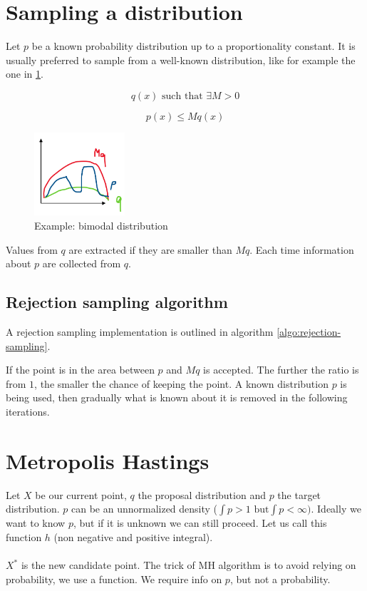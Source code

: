 \section{Sampling a distribution}
Let $p$ be a known probability distribution up to a proportionality constant.
It is usually preferred to sample from a well-known distribution, like for example the one in \ref{fig:bimodal}.

$$q(x)\text{ such that }\exists M>0$$

$$p(x) \leq M q(x)$$


\begin{figure}
  \centering
  \includegraphics[width=0.3\textwidth]{distribution.png}
  \caption{Example: bimodal distribution}
  \label{fig:bimodal}
\end{figure}

Values from $q$ are extracted if they are smaller than $Mq$.
Each time information about $p$ are collected from $q$.

  \subsection{Rejection sampling algorithm}
  A rejection sampling implementation is outlined in algorithm \ref{algo:rejection-sampling}.

  

  If the point is in the area between $p$ and $Mq$ is accepted.
  The further the ratio is from $1$, the smaller the chance of keeping the point.
  A known distribution $p$ is being used, then gradually what is known about it is removed in the following iterations.

\section{Metropolis Hastings}

Let $X$ be our current point, $q$ the proposal distribution and $p$ the
target distribution. $p$ can be an unnormalized density
($\int p > 1 \text{ but} \int p < \infty)$. Ideally we want to know $p$,
but if it is unknown we can still proceed. Let us call this function $h$
(non negative and positive integral).
\\
\\
\noindent
$X^*$ is the new candidate point. The trick of MH algorithm is to avoid
relying on probability, we use a function. We require info on $p$, but
not a probability.

